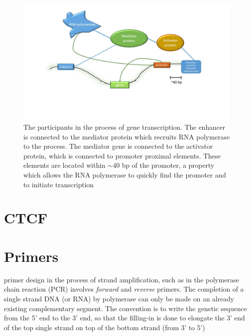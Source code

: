 \documentclass[12pt]{paper}
\begin{document}
\begin{figure}[H]
\includegraphics[scale=0.5]{mechanismOfGeneTransciption}
\caption{The participants in the process of gene transcription. The enhancer is connected to the mediator protein which recruits RNA polymerase to the process. The mediator gene is connected to the activator protein, which is connected to promoter proximal elements. These elements are located within $\sim$40 bp of the promoter, a property which allows the RNA polymerase to quickly find the promoter and to initiate transcription}
\label{mechanismOfGeneTranscription}
\end{figure}

\section{CTCF}\label{section_CTCF}

\section{Primers}\label{section_primers}
primer design in the process of strand amplification, such as in the polymerase chain reaction (PCR) involves \textit{forward} and \textit{reverse} primers. The completion of a single strand DNA (or RNA) by polymerase can only be made on an already existing complementary segment. The convention is to write the genetic sequence from the 5' end to the 3' end, so that the filling-in is done to elongate the 3' end of the top single strand on top of the bottom strand (from 3' to 5')

\end{document}
